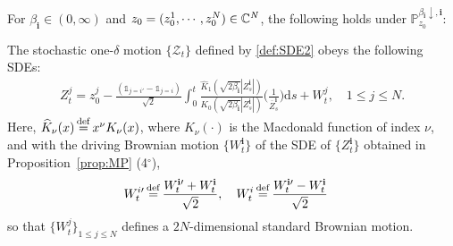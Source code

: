 \documentclass[12pt, twoside]{article}
\numberwithin{figure}{section}
\newcommand{\1}{\mathds 1}
\newcommand{\da}{{\downarrow}}
\newcommand{\ms}{\mathscr}
\renewcommand{\P}{{\mathbb P}}
\renewcommand{\d}{{\mathrm d}}
\newcommand{\2}{{\mathbf 1}}
\newcommand{\defeq}{{\stackrel{\rm def}{=}}}
\newcommand{\cc}{{^\circ}}
\newcommand{\bi}{\mathbf i}
\newcommand{\hK}{{\widehat{K}}}
\newcommand{\two}{{\sqrt{2}}}
\newcommand{\CN}{{\mathbb C}^{\it N}}
\begin{document}
\begin{thm}
\label{thm:MPSDE}
For $\beta_\bi\in (0,\infty)$ and $z_0=(z_0^1,\cdots,z_0^N)\in \CN$,
the following holds under  $\P^{\beta_\bi\da,\bi}_{z_0}$:\smallskip 

\noindent {\rm (1$\cc$)} The stochastic one-$\delta$ motion $\{\ms Z_t\}$ defined by \eqref{def:SDE2}
 obeys the following SDEs:
\begin{align}\label{def:ZSDE2}
Z^j_t=
 z_0^{j}-\frac{(\1_{j=i\prime}-\1_{j=i})}{\two}\int_0^t \frac{\hK_1(\sqrt{2\beta_\bi}|Z^\bi_s|)}{ K_0(\sqrt{2\beta_\bi}|Z^\bi_s|)}\biggl(\frac{1}{ \overline{Z}^\bi_s}\biggr)\d s+W^{j}_t,\quad 1\leq j\leq N.
\end{align}
Here, $\widehat{K}_\nu(x)\,\defeq\, x^\nu K_\nu(x)$, where $K_\nu(\cdot)$ is the Macdonald function of index $\nu$, and with the driving Brownian motion $\{W^\bi_t\}$ of the SDE of $\{Z^\bi_t\}$ obtained in Proposition~\ref{prop:MP} (4$\cc$),
\begin{align}
W^{i\prime}_t&\,\defeq \,\frac{W^{\bi\prime}_t+W^{\bi}_t}{\two},\quad W^{i}_t\,\defeq\, \frac{W^{\bi\prime}_t-W^{\bi}_t}{\two}\label{def:Wjj}
\end{align}
so that $\{W^j_t\}_{1\leq j\leq N}$ defines a $2N$-dimensional standard Brownian motion.\smallskip 


\end{thm}
\end{document}
